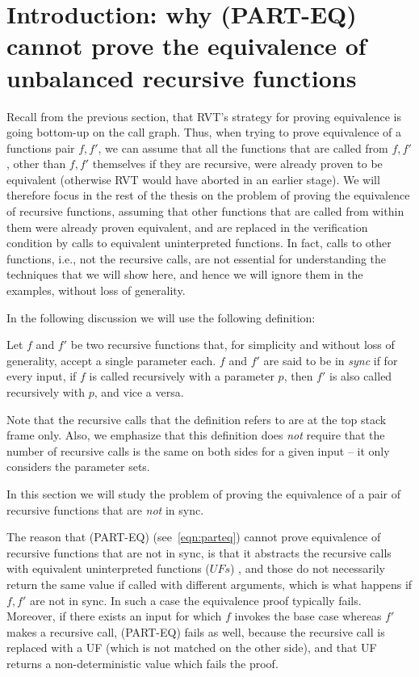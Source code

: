\newcommand\os[1]{\textcolor{blue}{[os: #1]}}
\newcommand\crjs[1]{\textcolor{purple}{[CRJS: #1]}}
\section{Introduction: why (PART-EQ) cannot prove the equivalence of unbalanced recursive functions}
Recall from the previous section, that RVT's strategy for proving equivalence is going bottom-up on the call graph. Thus, when trying to prove equivalence of a functions pair $f,f'$, we can assume that all the functions that are called from $f,f'$, other than $f,f'$ themselves if they are recursive, were already proven to be equivalent (otherwise RVT would have aborted in an earlier stage). We will therefore focus in the rest of the thesis on the problem of proving the equivalence of recursive functions, assuming that other functions that are called from within them were already proven equivalent, and are replaced in the verification condition by calls to equivalent uninterpreted functions. In fact, calls to other functions, i.e., not the recursive calls, are not essential for understanding the techniques that we will show here, and hence we will ignore them in the examples, without loss of generality. 

In the following discussion we will use the following definition:
\begin{definition}[Sync] \label{def:sync}
Let $f$ and $f'$ be two recursive functions that, for simplicity and without loss of generality, accept a single parameter each. $f$ and $f'$ are said to be in \emph{sync} if for every input, if $f$ is called recursively with a parameter $p$, then $f'$ is also called recursively with $p$, and vice a versa. 
\end{definition}
%
Note that the recursive calls that the definition refers to are at the top stack frame only.  
Also, we emphasize that this definition does \emph{not} require that the number of recursive calls is the same on both sides for a given input -- it only considers the parameter sets.

In this section we will study the problem of proving the equivalence of a pair of recursive functions that are \emph{not} in sync. 

The reason that (PART-EQ) (see~\ref{eqn:parteq}) cannot prove equivalence of recursive functions that are not in sync, is that it abstracts the recursive calls with equivalent uninterpreted functions ($UFs$) \cite{DBLP:conf/dac/GodlinS09}, and those do not necessarily return the same value if called with different arguments, which is what happens if $f,f'$ are not in sync. In such a case the equivalence proof typically fails.
Moreover, if there exists an input for which $f$ invokes the base case whereas $f'$ makes a recursive call, (PART-EQ) fails as well, because the recursive call is replaced with a UF (which is not matched on the other side), and that UF returns a non-deterministic value which fails the proof.

